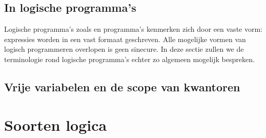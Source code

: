 \subsection{In logische programma's}
Logische programma's zoals \prolog{} en \problog{} programma's kenmerken zich door een vaste vorm: expressies worden in een vast formaat geschreven. Alle mogelijke vormen van logisch programmeren overlopen is geen sinecure. In deze sectie zullen we de terminologie rond logische programma's echter zo algemeen mogelijk bespreken.
\subsection{Vrije variabelen en de scope van kwantoren}
\section{Soorten logica}